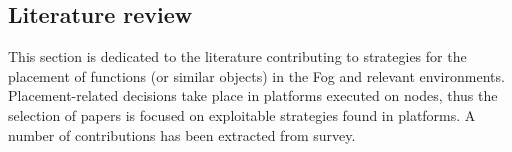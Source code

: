 \documentclass[11pt]{sdm}
\begin{document}
\subsection{Literature review \label{sec:literature_review}}

This section is dedicated to the literature contributing to strategies for the placement of functions (or similar objects) in the Fog and relevant environments. Placement-related decisions take place in platforms executed on nodes, thus the selection of papers is focused on exploitable strategies found in platforms. A number of contributions has been extracted from  survey.

\end{document}
